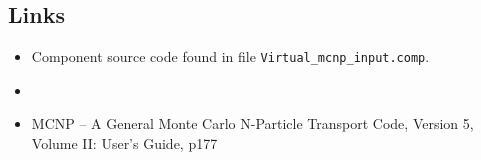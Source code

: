 \subsection*{Links}
\begin{itemize}
  \item Component source code found in file \texttt{Virtual\_mcnp\_input.comp}.
  \item {}
  \item MCNP -- A General Monte Carlo N-Particle Transport Code, Version 5, Volume II: User's Guide, p177
\end{itemize}
